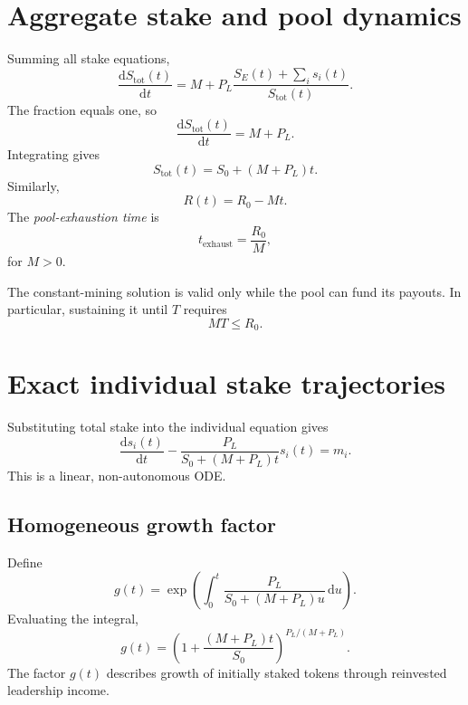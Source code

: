\documentclass[11pt,a4paper]{article}
\newcommand{\rmd}{\mathrm{d}}
\begin{document}
\section{Aggregate stake and pool dynamics}
Summing all stake equations,
\begin{equation}
\frac{\rmd S_{\mathrm{tot}}(t)}{\rmd t}=M+P_L\frac{S_E(t)+\sum_i s_i(t)}{S_{\mathrm{tot}}(t)}.
\end{equation}
The fraction equals one, so
\begin{equation}
\frac{\rmd S_{\mathrm{tot}}(t)}{\rmd t}=M+P_L.
\end{equation}
Integrating gives
\begin{equation}
\boxed{S_{\mathrm{tot}}(t)=S_0+(M+P_L)t.}\label{eq:Stot}
\end{equation}
Similarly,
\begin{equation}
\boxed{R(t)=R_0-Mt.}
\end{equation}
The \emph{pool-exhaustion time} is
\begin{equation}
\boxed{t_{\mathrm{exhaust}}=\frac{R_0}{M}},
\end{equation}
for $M>0$.

The constant-mining solution is valid only while the pool can fund its payouts. In particular, sustaining it until $T$ requires
\begin{equation}
\boxed{MT\le R_0.}
\end{equation}

\section{Exact individual stake trajectories}
Substituting total stake into the individual equation gives
\begin{equation}
\frac{\rmd s_i(t)}{\rmd t}-\frac{P_L}{S_0+(M+P_L)t}s_i(t)=m_i.
\end{equation}
This is a linear, non-autonomous ODE.

\subsection{Homogeneous growth factor}
Define
\begin{equation}
g(t)=\exp\!\left(\int_0^t\frac{P_L}{S_0+(M+P_L)u}\,\rmd u\right).
\end{equation}
Evaluating the integral,
\begin{equation}
\boxed{g(t)=\left(1+\frac{(M+P_L)t}{S_0}\right)^{P_L/(M+P_L)}.}
\end{equation}
The factor $g(t)$ describes growth of initially staked tokens through reinvested leadership income.
\end{document}
